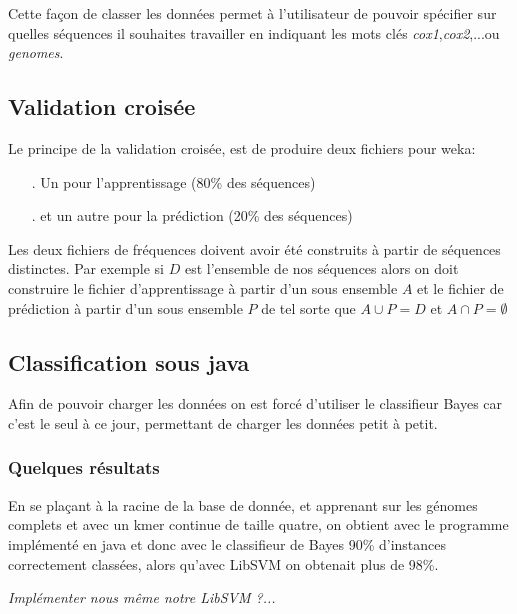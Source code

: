 Cette façon de classer les données permet à l'utilisateur de pouvoir spécifier sur quelles séquences il souhaites travailler en indiquant les mots clés \textit{cox1},\textit{cox2},...ou \textit{genomes}.

\subsection{Validation croisée}

Le principe de la validation croisée, est de produire deux fichiers pour weka:
\begin{itemize}
  \item[.] Un pour l'apprentissage (80\% des séquences)
  \item[.] et un autre pour la prédiction (20\% des séquences)
\end{itemize}

Les deux fichiers de fréquences doivent avoir été construits à partir de séquences distinctes. Par exemple si $D$ est l'ensemble de nos séquences alors
on doit construire le fichier d'apprentissage à partir d'un sous ensemble $A$ et le fichier de prédiction à partir d'un sous ensemble $P$ de 
tel sorte que $A \cup P = D $ et  $ A \cap P = \emptyset $  

\subsection{Classification sous java}

Afin de pouvoir charger les données on est forcé d'utiliser le classifieur Bayes car c'est le seul à ce jour, 
permettant de charger les données petit à petit. 

\subsubsection{Quelques résultats}
En se plaçant à la racine de la base de donnée, et apprenant sur les génomes complets et avec un kmer continue de taille quatre, on obtient avec le programme implémenté en java et donc avec le classifieur de Bayes 90\% d'instances correctement classées, alors qu'avec LibSVM on obtenait plus de 98\%. 


{\scriptsize \textit{Implémenter nous même notre LibSVM ?...}}
